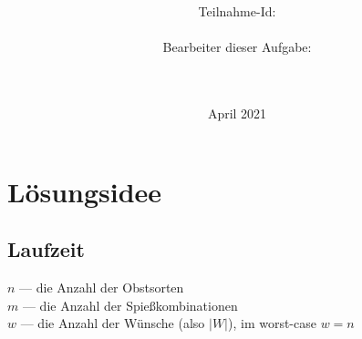\documentclass[a4paper,10pt,ngerman]{scrartcl}
\title{\textbf{\Huge\Aufgabe}}
\author{\LARGE Teilnahme-Id: \LARGE \TeilnahmeId \\\\
	    \LARGE Bearbeiter dieser Aufgabe: \\ 
	    \LARGE \Namen\\\\}
\date{\LARGE April 2021}
\begin{document}
\maketitle
\tableofcontents

\section{Lösungsidee}










\subsection{Laufzeit}\label{sec:laufzeit}
$n$ --- die Anzahl der Obstsorten\\
$m$ --- die Anzahl der Spießkombinationen\\
$w$ --- die Anzahl der Wünsche (also $|W|$), im worst-case $w = n$
\end{document}
